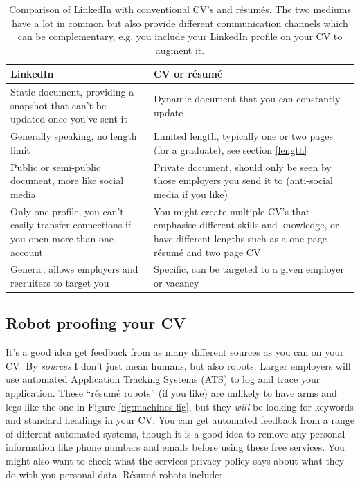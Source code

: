 \documentclass[
]{book}
\begin{document}
\begin{table}

\caption{\label{tab:linkedintable}Comparison of LinkedIn with conventional CV's and résumés. The two mediums have a lot in common but also provide different communication channels which can be complementary, e.g. you include your LinkedIn profile on your CV to augment it.}
\centering
\begin{tabular}[t]{ll}
\toprule
LinkedIn & CV or résumé\\
\midrule
Static document, providing a snapshot that can't be updated once you've  sent it & Dynamic document that you can constantly update\\
Generally speaking, no length limit & Limited length, typically one or two pages (for a graduate), see section \ref{length}\\
Public or semi-public document, more like social media & Private document, should only be seen by those employers you send it to (anti-social media if you like)\\
Only one profile, you can't easily transfer connections if you open more than one account & You might create multiple CV's that emphasise different skills and knowledge, or have different lengths such as a one page résumé and two page CV\\
Generic, allows employers and recruiters to target you & Specific, can be targeted to a given employer or vacancy\\
\bottomrule
\end{tabular}
\end{table}



\hypertarget{robotproof}{%
\subsection{Robot proofing your CV}\label{robotproof}}

It's a good idea get feedback from as many different sources as you can on your CV. By \emph{sources} I don't just mean humans, but also robots. Larger employers will use automated \href{https://en.wikipedia.org/wiki/Applicant_tracking_system}{Application Tracking Systems} (ATS) to log and trace your application. These ``résumé robots'' (if you like) are unlikely to have arms and legs like the one in Figure \ref{fig:machines-fig}, but they \emph{will} be looking for keywords and standard headings in your CV. You can get automated feedback from a range of different automated systems, though it is a good idea to remove any personal information like phone numbers and emails before using these free services. You might also want to check what the services privacy policy says about what they do with you personal data. Résumé robots include:
\end{document}
